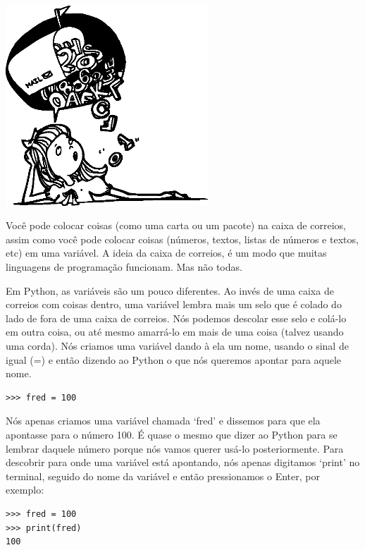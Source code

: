 \begin{center}
\includegraphics*[width=76mm]{eps/girlbubble.eps}
\end{center}

Você pode colocar coisas (como uma carta ou um pacote) na caixa de correios, assim como você pode colocar coisas (números, textos, listas de números e textos, etc) em uma variável. A ideia da caixa de correios, é um modo que muitas linguagens de programação funcionam. Mas não todas.

Em Python, as variáveis são um pouco diferentes. Ao invés de uma caixa de correios com coisas dentro, uma variável lembra mais um selo que é colado do lado de fora de uma caixa de correios. Nós podemos descolar esse selo e colá-lo em outra coisa, ou até mesmo amarrá-lo em mais de uma coisa (talvez usando uma corda). Nós criamos uma variável dando à ela um nome, usando o sinal de igual (=) e então dizendo ao Python o que nós queremos apontar para aquele nome.

\begin{listing}
\begin{verbatim}
>>> fred = 100
\end{verbatim}
\end{listing}

Nós apenas criamos uma variável chamada `fred' e dissemos para que ela apontasse para o número 100. É quase o mesmo que dizer ao Python para se lembrar daquele número porque nós vamos querer usá-lo posteriormente. Para descobrir para onde uma variável está apontando, nós apenas digitamos `print' no terminal, seguido do nome da variável e então pressionamos o Enter, por exemplo:

\begin{listing}
\begin{verbatim}
>>> fred = 100
>>> print(fred)
100
\end{verbatim}
\end{listing}


